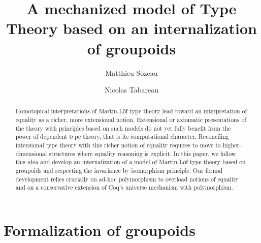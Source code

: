 \documentclass[runningheads,a4paper]{llncs}
\begin{document}
\mainmatter  %

\title{A mechanized model of Type Theory based on an
  internalization of groupoids}

\author{Matthieu Sozeau \and Nicolas Tabareau}

\date{}



\def\mathrm#1{#1}

\maketitle

\begin{abstract}
  Homotopical interpretations of Martin-Löf type theory lead toward an
  interpretation of equality as a richer, more extensional
  notion. Extensional or axiomatic presentations of the theory with
  principles based on such models do not yet fully benefit from the
  power of dependent type theory, that is its computational
  character. Reconciling intensional type theory with this richer notion
  of equality requires to move to higher-dimensional structures where
  equality reasoning is explicit. In this paper, we follow this idea and
  develop an internalization of a model of Martin-Löf type theory based
  on groupoids and respecting the invariance by isomorphism principle.
  Our formal development relies crucially on ad-hoc polymorphism to
  overload notions of equality and on a conservative extension of
  Coq's universe mechanism with polymorphism.
\end{abstract}







\section{Formalization of groupoids}
\label{sec:formalization}
\end{document}
